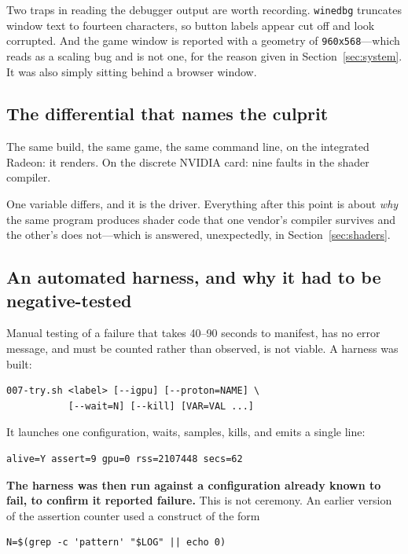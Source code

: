Two traps in reading the debugger output are worth recording. \verb|winedbg|
truncates window text to fourteen characters, so button labels appear cut off and
look corrupted. And the game window is reported with a geometry of
\verb|960x568|---which reads as a scaling bug and is not one, for the reason
given in Section~\ref{sec:system}. It was also simply sitting behind a browser
window.

\subsection{The differential that names the culprit}

The same build, the same game, the same command line, on the integrated Radeon:
it renders. On the discrete NVIDIA card: nine faults in the shader compiler.

One variable differs, and it is the driver. Everything after this point is about
\emph{why} the same program produces shader code that one vendor's compiler
survives and the other's does not---which is answered, unexpectedly, in
Section~\ref{sec:shaders}.

\subsection{An automated harness, and why it had to be negative-tested}

Manual testing of a failure that takes 40--90 seconds to manifest, has no error
message, and must be counted rather than observed, is not viable. A harness was
built:

\begin{lstlisting}
007-try.sh <label> [--igpu] [--proton=NAME] \
           [--wait=N] [--kill] [VAR=VAL ...]
\end{lstlisting}

It launches one configuration, waits, samples, kills, and emits a single line:

\begin{lstlisting}
alive=Y assert=9 gpu=0 rss=2107448 secs=62
\end{lstlisting}

\textbf{The harness was then run against a configuration already known to fail,
to confirm it reported failure.} This is not ceremony. An earlier version of the
assertion counter used a construct of the form

\begin{lstlisting}
N=$(grep -c 'pattern' "$LOG" || echo 0)
\end{lstlisting}

